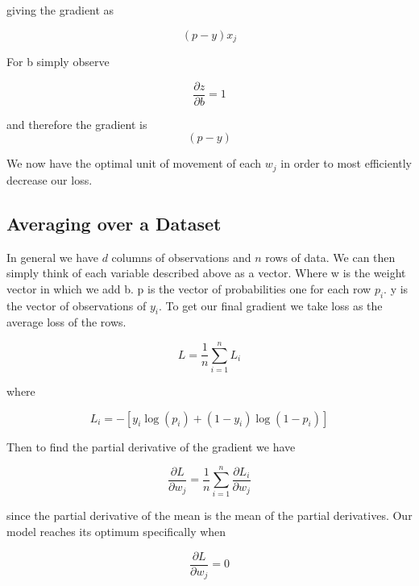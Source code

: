 \documentclass{article}
\theoremstyle{remark}
\begin{document}
giving the gradient as

\begin{equation}
(p - y)x_j
\end{equation}

For b simply observe

\begin{equation*}
\frac{\partial z}{\partial b} = 1
\end{equation*}

and therefore the gradient is 
\begin{equation}
(p - y)
\end{equation}

We now have the optimal unit of movement of each $w_j$ in order to most efficiently
decrease our loss. 

\subsection{Averaging over a Dataset}

In general we have $d$ columns of observations and $n$ rows of data. 
We can then simply think of each variable described above as a vector. 
Where w is the weight vector in which we add b.
p is the vector of probabilities one for each row $p_i$.
y is the vector of observations of $y_i$.
To get our final gradient we take loss as the average loss of the rows.

\begin{equation}
L = \frac{1}{n}\sum_{i=1}^{n}L_i
\end{equation}

where 

\begin{equation*}
L_i = -[y_i\log\!\left(p_i\right) + (1 - y_i)\log\!\left(1-p_i\right)]
\end{equation*}

Then to find the partial derivative of the gradient we have 

\begin{equation*}
\frac{\partial L}{\partial w_j} =
\frac{1}{n}\sum_{i=1}^{n}\frac{\partial L_i}{\partial w_j}
\end{equation*}

since the partial derivative of the mean is the mean of the partial derivatives.
Our model reaches its optimum specifically when

\begin{equation}
\frac{\partial L}{\partial w_j} = 0
\end{equation}
\end{document}
